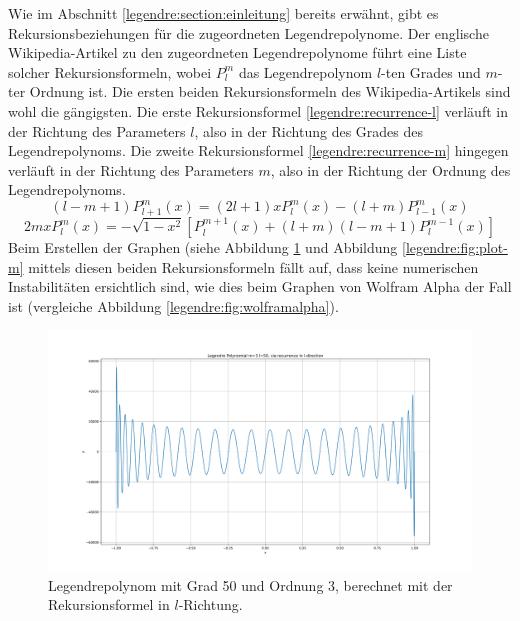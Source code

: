 Wie im Abschnitt \ref{legendre:section:einleitung} bereits erwähnt, gibt es Rekursionsbeziehungen für die zugeordneten Legendrepolynome.
Der englische Wikipedia-Artikel \cite{legendre:wikipedia} zu den zugeordneten Legendrepolynome führt eine Liste solcher Rekursionsformeln, wobei $P^{m}_{l}$ das Legendrepolynom $l$-ten Grades und $m$-ter Ordnung ist.
Die ersten beiden Rekursionsformeln des Wikipedia-Artikels sind wohl die gängigsten.
Die erste Rekursionsformel \eqref{legendre:recurrence-l} verläuft in der Richtung des Parameters $l$, also in der Richtung des Grades des Legendrepolynoms.
Die zweite Rekursionsformel \eqref{legendre:recurrence-m} hingegen verläuft in der Richtung des Parameters $m$, also in der Richtung der Ordnung des Legendrepolynoms.
\begin{equation}
(l-m+1)P^{m}_{l+1}(x)
=(2l+1)xP^{m}_{l}(x)
-(l+m)P^{m}_{l-1}(x)
\label{legendre:recurrence-l}
\end{equation}
\begin{equation}
2mxP^{m}_{l}(x)
=-\sqrt{1-x^2}
\left[ P^{m+1}_{l}(x) + (l+m)(l-m+1)P^{m-1}_{l}(x) \right]
\label{legendre:recurrence-m}
\end{equation}
Beim Erstellen der Graphen (siehe Abbildung \ref{legendre:fig:plot-l} und Abbildung \ref{legendre:fig:plot-m} mittels diesen beiden Rekursionsformeln fällt auf, dass keine numerischen Instabilitäten ersichtlich sind, wie dies beim Graphen von Wolfram Alpha der Fall ist (vergleiche Abbildung \ref{legendre:fig:wolframalpha}).
\begin{figure}[!h]
\centering
\includegraphics[width=1.0\linewidth]{papers/legendre/plots/plot_l}
\caption{Legendrepolynom mit Grad 50 und Ordnung 3, berechnet mit der Rekursionsformel in \texorpdfstring{$l$}{l}-Richtung.}
\label{legendre:fig:plot-l}
\end{figure}
